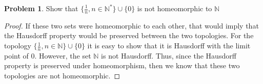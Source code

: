 \documentclass[11pt]{article}
\theoremstyle{definition}
\newtheorem{problem}{Problem}
\newcommand{\N}{\mathbb{N}}
\begin{document}
\pagebreak
\begin{problem}
    Show that $\{\frac{1}{n}, n \in \N^*\} \cup \{0\}$ is not homeomorphic to $\N$
\end{problem}
\begin{proof}
    If these two sets were homeomorphic to each other, that would imply that the Hausdorff property would be preserved between the two topologies. For the topology $\{\frac{1}{n}, n\in \N\} \cup \{0\}$ it is easy to show that it is Hausdorff with the limit point of $0$. However, the set $\N$ is not Hausdorff. Thus, since the Hausdorff property is preserved under homeomorphism, then we know that these two topologies are not homeomorphic.
\end{proof}
\end{document}

